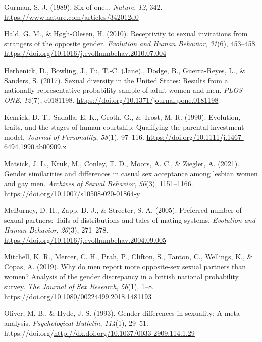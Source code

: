 \documentclass[
  11pt,
]{article}
\newlength{\cslhangindent}
\newlength{\cslentryspacingunit} %
\newenvironment{CSLReferences}[2] %
 {%
  \setlength{\parindent}{0pt}
  \ifodd #1
  \let\oldpar\par
  \def\par{\hangindent=\cslhangindent\oldpar}
  \fi
  \setlength{\parskip}{#2\cslentryspacingunit}
 }%
 {}
\begin{document}
\begin{CSLReferences}{1}{0}
\leavevmode{}%
Gurman, S. J. (1989). Six of one... \emph{Nature}, \emph{12}, 342.
\url{https://www.nature.com/articles/342012d0}

\leavevmode{}%
Hald, G. M., \& Høgh-Olesen, H. (2010). Receptivity to sexual
invitations from strangers of the opposite gender. \emph{Evolution and
Human Behavior}, \emph{31}(6), 453--458.
\url{https://doi.org/10.1016/j.evolhumbehav.2010.07.004}

\leavevmode{}%
Herbenick, D., Bowling, J., Fu, T.-C. (Jane)., Dodge, B., Guerra-Reyes,
L., \& Sanders, S. (2017). Sexual diversity in the {United States}:
Results from a nationally representative probability sample of adult
women and men. \emph{{PLOS} {ONE}}, \emph{12}(7), e0181198.
\url{https://doi.org/10.1371/journal.pone.0181198}

\leavevmode{}%
Kenrick, D. T., Sadalla, E. K., Groth, G., \& Trost, M. R. (1990).
Evolution, traits, and the stages of human courtship: Qualifying the
parental investment model. \emph{Journal of Personality}, \emph{58}(1),
97--116. \url{https://doi.org/10.1111/j.1467-6494.1990.tb00909.x}

\leavevmode{}%
Matsick, J. L., Kruk, M., Conley, T. D., Moors, A. C., \& Ziegler, A.
(2021). Gender similarities and differences in casual sex acceptance
among lesbian women and gay men. \emph{Archives of Sexual Behavior},
\emph{50}(3), 1151--1166.
\url{https://doi.org/10.1007/s10508-020-01864-y}

\leavevmode{}%
McBurney, D. H., Zapp, D. J., \& Streeter, S. A. (2005). Preferred
number of sexual partners: Tails of distributions and tales of mating
systems. \emph{Evolution and Human Behavior}, \emph{26}(3), 271--278.
\url{https://doi.org/10.1016/j.evolhumbehav.2004.09.005}

\leavevmode{}%
Mitchell, K. R., Mercer, C. H., Prah, P., Clifton, S., Tanton, C.,
Wellings, K., \& Copas, A. (2019). Why do men report more opposite-sex
sexual partners than women? Analysis of the gender discrepancy in a
british national probability survey. \emph{The Journal of Sex Research},
\emph{56}(1), 1--8. \url{https://doi.org/10.1080/00224499.2018.1481193}

\leavevmode{}%
Oliver, M. B., \& Hyde, J. S. (1993). Gender differences in sexuality: A
meta-analysis. \emph{Psychological Bulletin}, \emph{114}(1), 29--51.
https://doi.org/\url{http://dx.doi.org/10.1037/0033-2909.114.1.29}


\end{CSLReferences}
\end{document}
